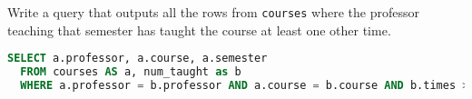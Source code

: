\question Write a query that outputs all the rows from \texttt{courses} where
the professor teaching that semester has taught the course at least one other
time.
\begin{solution}[0.75in]
\begin{lstlisting}[language=SQL]
SELECT a.professor, a.course, a.semester
  FROM courses AS a, num_taught as b
  WHERE a.professor = b.professor AND a.course = b.course AND b.times > 1;
\end{lstlisting}
\end{solution}
